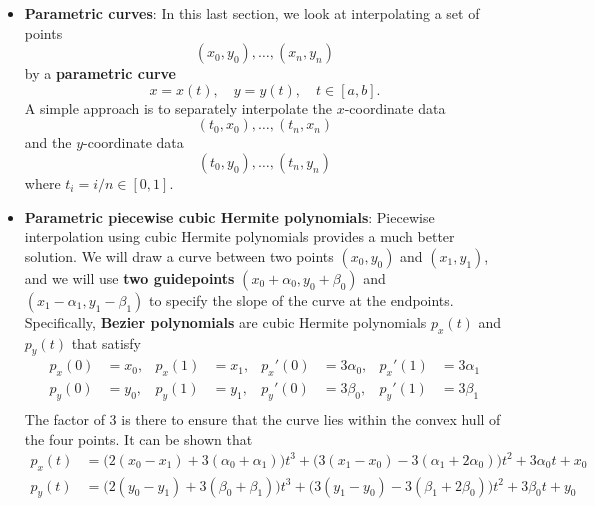 \documentclass{report}
\begin{document}
\begin{itemize}
    \item \textbf{Parametric curves}:
        In this last section, we look at interpolating a set of points 
        $$(x_0, y_0), \ldots, (x_n, y_n)$$
        by a \textbf{parametric curve}
        $$x = x(t), \quad y = y(t), \quad t \in [a,b].$$
        A simple approach is to separately interpolate the $x$-coordinate data
        $$(t_0, x_0), \ldots, (t_n, x_n)$$
        and the $y$-coordinate data
        $$(t_0, y_0), \ldots, (t_n, y_n)$$
        where $t_i = i/n \in [0, 1]$.
    \item \textbf{ Parametric piecewise cubic Hermite polynomials}:
        Piecewise interpolation using cubic Hermite polynomials provides a much better solution.
        \bigbreak \noindent 
        We will draw a curve between two points $(x_0,y_0)$ and $(x_1,y_1)$, and we will use \textbf{two guidepoints} $(x_0+\alpha_0,y_0+\beta_0)$ and $(x_1-\alpha_1,y_1-\beta_1)$ to specify the slope of the curve at the endpoints.
        \bigbreak \noindent 
        Specifically, \textbf{Bezier polynomials} are cubic Hermite polynomials $p_x(t)$ and $p_y(t)$ that satisfy
        $$
        \begin{align}
            p_x(0) &= x_0, &p_x(1) &= x_1, &p_x'(0) &= 3\alpha_0, &p_x'(1) &= 3\alpha_1\\
            p_y(0) &= y_0, &p_y(1) &= y_1, &p_y'(0) &= 3\beta_0,  &p_y'(1) &= 3\beta_1\\
        \end{align}
        $$
        The factor of 3 is there to ensure that the curve lies within the convex hull of the four points.
        \bigbreak \noindent 
        It can be shown that
        $$
        \begin{align}
            p_x(t) &= \big(2(x_0 - x_1) + 3(\alpha_0 + \alpha_1)\big) t^3 + \big(3(x_1 - x_0) - 3(\alpha_1 + 2\alpha_0)\big) t^2 + 3\alpha_0 t + x_0\\
            p_y(t) &= \big(2(y_0 - y_1) + 3(\beta_0 + \beta_1)\big) t^3 + \big(3(y_1 - y_0) - 3(\beta_1 + 2\beta_0)\big) t^2 + 3\beta_0 t + y_0\\
        \end{align}
        $$


     \end{itemize}

     \pagebreak 
\end{document}
